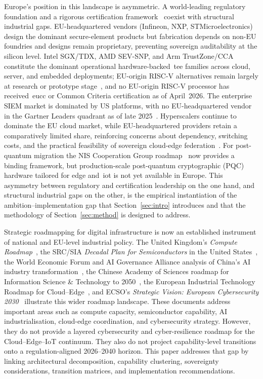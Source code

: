 \documentclass{ieeeaccess}
\begin{document}
Europe's position in this landscape is asymmetric. A world-leading regulatory foundation and a rigorous certification framework~\cite{commreg2024eucc,eucsa} coexist with structural industrial gaps. EU-headquartered vendors (Infineon, NXP, STMicroelectronics) design the dominant secure-element products but fabrication depends on non-EU foundries and designs remain proprietary, preventing sovereign auditability at the silicon level. Intel SGX/TDX, AMD SEV-SNP, and Arm TrustZone/CCA constitute the dominant operational hardware-backed~\gls{tee} families across cloud, server, and embedded deployments; EU-origin RISC-V alternatives remain largely at research or prototype stage~\cite{Munoz2023-pw}, and no EU-origin RISC-V processor has received~\gls{eucc} or Common Criteria certification as of April~2026. The enterprise SIEM market is dominated by US platforms, with no EU-headquartered vendor in the Gartner Leaders quadrant as of late 2025~\cite{gartner2025siem}. Hyperscalers continue to dominate the EU cloud market, while EU-headquartered providers retain a comparatively limited share, reinforcing concerns about dependency, switching costs, and the practical feasibility of sovereign cloud-edge federation~\cite{synergy2025}. For post-quantum migration the NIS Cooperation Group roadmap~\cite{niscg2025pqc} now provides a binding framework, but production-scale post-quantum cryptographic (PQC) hardware tailored for edge and~\gls{iot} is not yet available in Europe. This asymmetry between regulatory and certification leadership on the one hand, and structural industrial gaps on the other, is the empirical instantiation of the ambition--implementation gap that Section~\ref{sec:intro} introduces and that the methodology of Section~\ref{sec:method} is designed to address.

Strategic roadmapping for digital infrastructure is now an established instrument of national and EU-level industrial policy. The United Kingdom's \emph{Compute Roadmap}~\cite{ukcompute2025}, the SRC/SIA \emph{Decadal Plan for Semiconductors} in the United States~\cite{srcsia2021decadal}, the World Economic Forum and AI Governance Alliance analysis of China's AI industry transformation~\cite{wef2025china}, the Chinese Academy of Sciences roadmap for Information Science \& Technology to 2050~\cite{li2011china}, the European Industrial Technology Roadmap for Cloud--Edge~\cite{ecroadmap2024}, and ECSO's \emph{Strategic Vision: European Cybersecurity 2030}~\cite{ecso2025vision} illustrate this wider roadmap landscape. These documents address important areas such as compute capacity, semiconductor capability, AI industrialisation, cloud-edge coordination, and cybersecurity strategy. However, they do not provide a layered cybersecurity and cyber-resilience roadmap for the Cloud--Edge--IoT continuum. They also do not project capability-level transitions onto a regulation-aligned 2026--2040 horizon. This paper addresses that gap by linking architectural decomposition, capability clustering, sovereignty considerations, transition matrices, and implementation recommendations.
\end{document}
